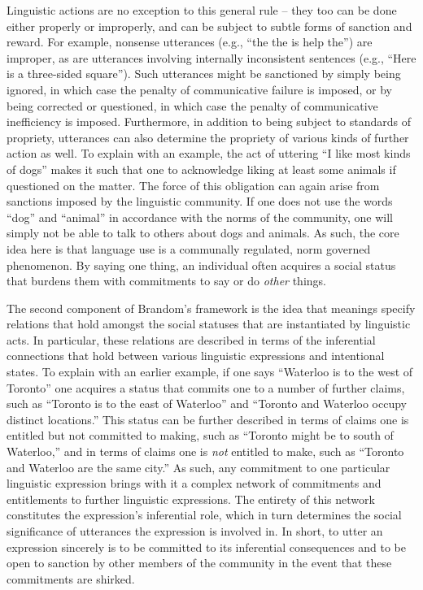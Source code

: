 Linguistic actions are no exception to this general rule -- they too can be done either properly or improperly, and can be subject to subtle forms of sanction and reward. For example, nonsense utterances (e.g., ``the the is help the'') are improper, as are utterances involving internally inconsistent sentences (e.g., ``Here is a three-sided square''). Such utterances might be sanctioned by simply being ignored, in which case the penalty of communicative failure is imposed, or by being corrected or questioned, in which case the penalty of communicative inefficiency is imposed. Furthermore, in addition to being subject to standards of propriety, utterances can also determine the propriety of various kinds of further action as well. To explain with an example, the act of uttering ``I like most kinds of dogs'' makes it such that one  to acknowledge liking at least some animals if questioned on the matter. The force of this obligation can again arise from sanctions imposed by the linguistic community. If one does not use the words ``dog'' and ``animal'' in accordance with the norms of the community, one will simply not be able to talk to others about dogs and animals. As such, the core idea here is that language use is a communally regulated, norm governed phenomenon. By saying one thing, an individual often acquires a social status that burdens them with commitments to say or do \textit{other} things.

The second component of Brandom's framework is the idea that meanings specify relations that hold amongst the social statuses that are instantiated by linguistic acts. In particular, these relations are described in terms of the inferential connections that hold between various linguistic expressions and intentional states. To explain with an earlier example, if one says ``Waterloo is to the west of Toronto'' one acquires a status that commits one to a number of further claims, such as ``Toronto is to the east of Waterloo'' and ``Toronto and Waterloo occupy distinct locations.'' This status can be further described in terms of claims one is entitled but not committed to making, such as ``Toronto might be to south of Waterloo,'' and in terms of claims one is \textit{not} entitled to make, such as ``Toronto and Waterloo are the same city.'' As such, any commitment to one particular linguistic expression brings with it a complex network of commitments and entitlements to further linguistic expressions. The entirety of this network constitutes the expression's inferential role, which in turn determines the social significance of utterances the expression is involved in. In short, to utter an expression sincerely is to be committed to its inferential consequences and to be open to sanction by other members of the community in the event that these commitments are shirked. 

